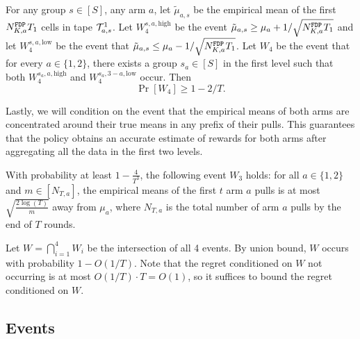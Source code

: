 \begin{lemma}\label{3levelw4}
  For any group $s\in [S]$, any arm $a$, let $\tilde\mu_{a,s}$ be the
  empirical mean of the first $N^\mathtt{FDP}_{K,a}  T_1$ cells in tape $\mathcal{T}^1_{a, s}$.
  Let $W_4^{s,a,\text{high}}$ be the event
  $\tilde\mu_{a, s} \geq \mu_a + 1/\sqrt{N^\mathtt{FDP}_{K,a}  T_1}$ and let
  $W_4^{s,a,\text{low}}$ be the event that
  $\tilde\mu_{a, s} \leq \mu_a - 1/\sqrt{N^\mathtt{FDP}_{K,a}  T_1}$.  Let $W_4$ be the
  event that for every $a\in \{1, 2\}$, there exists a group
  $s_a\in [S]$ in the first level such that both $W_4^{s_a,a,\text{high}}$
  and $W_4^{s_a,3-a,\text{low}}$ occur. Then
  \[
    \Pr[W_4]\geq 1 -2 /T.
  \]
\end{lemma}




Lastly, we will condition on the event that the empirical means of
both arms are concentrated around their true means in any prefix of
their pulls. This guarantees that the policy obtains an accurate
estimate of rewards for both arms after aggregating all the data in
the first two levels.


 

\begin{lemma}\label{3levelw3}
  With probability at least $1 - \frac{4}{T^3}$, the following event
  $W_3$ holds: for all $a\in \{1, 2\}$ and $m \in [N_{T, a}]$, the
  empirical means of the first $t$  arm $a$ pulls is at most
  $\sqrt{\frac{2\log(T)}{m}}$ away from $\mu_a$, where $N_{T, a}$ is
  the total number of arm $a$ pulls by the end of $T$ rounds.
\end{lemma}




Let $W = \bigcap_{i=1}^4 W_i$ be the intersection of all 4
events.  By union bound, $W$ occurs with probability $1-O(1/T)$. Note
that the regret conditioned on $W$ not occurring is at most
$O(1/T) \cdot T = O(1)$, so it suffices to bound the regret conditioned on $W$.



\subsection{Events}



